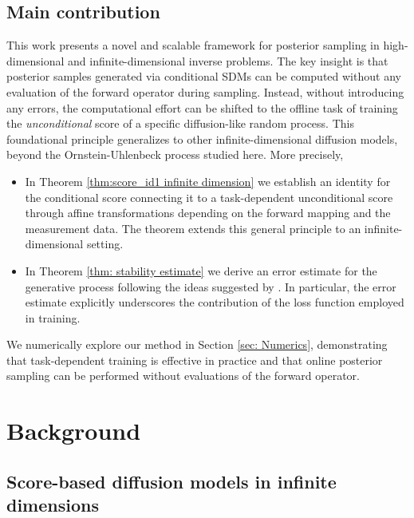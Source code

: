 \documentclass[10pt]{article} %
\theoremstyle{plain}
\theoremstyle{definition}
\theoremstyle{remark}
\newcommand{\duclam}[1]{#1}%
\begin{document}
\subsection{Main contribution}
\duclam{This work presents a novel and scalable framework for posterior sampling in high-dimensional and infinite-dimensional inverse problems. The key insight is that posterior samples generated via conditional SDMs can be computed without any evaluation of the forward operator during sampling.}
Instead, without introducing any errors, the computational effort can be shifted to the offline task of training the \emph{unconditional} score of a specific diffusion-like random process. This foundational principle generalizes to other infinite-dimensional diffusion models, beyond the Ornstein-Uhlenbeck process studied here.
More precisely, 
\begin{itemize}
    \item In Theorem \ref{thm:score_id1 infinite dimension} we establish an identity for the conditional score connecting it to a task-dependent unconditional score through affine transformations depending on the forward mapping and the measurement data. The theorem extends this general principle to an infinite-dimensional setting.
    \item In Theorem \ref{thm: stability estimate} we derive an error estimate for the generative process following the ideas suggested by  \citet{pidstrigach2023infinitedimensional}.
    In particular, the error estimate explicitly underscores the contribution of the loss function employed in training.
\end{itemize}
We numerically explore our method in Section \ref{sec: Numerics}, demonstrating that task-dependent training is effective in practice and that online posterior sampling can be performed without evaluations of the forward operator.





\section{Background}

\subsection{Score-based diffusion models in infinite dimensions}
\label{subsec:score-diffusion_in_infdim}
\end{document}
